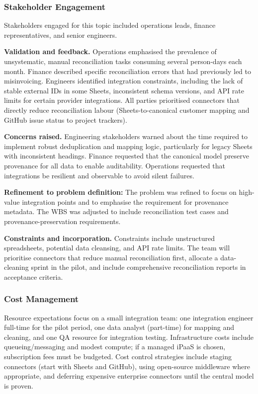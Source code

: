 \documentclass[12pt,a4paper]{report}
\begin{document}
\subsubsection{Stakeholder Engagement}
Stakeholders engaged for this topic included operations leads, finance representatives, and senior engineers.

\textbf{Validation and feedback.} Operations emphasised the prevalence of unsystematic, manual reconciliation tasks consuming several person-days each month. Finance described specific reconciliation errors that had previously led to misinvoicing. Engineers identified integration constraints, including the lack of stable external IDs in some Sheets, inconsistent schema versions, and API rate limits for certain provider integrations. All parties prioritised connectors that directly reduce reconciliation labour (Sheets-to-canonical customer mapping and GitHub issue status to project trackers).

\textbf{Concerns raised.} Engineering stakeholders warned about the time required to implement robust deduplication and mapping logic, particularly for legacy Sheets with inconsistent headings. Finance requested that the canonical model preserve provenance for all data to enable auditability. Operations requested that integrations be resilient and observable to avoid silent failures.

\begin{noteBox}
\textbf{Refinement to problem definition:} The problem was refined to focus on high-value integration points and to emphasise the requirement for provenance metadata. The WBS was adjusted to include reconciliation test cases and provenance-preservation requirements.
\end{noteBox}

\textbf{Constraints and incorporation.} Constraints include unstructured spreadsheets, potential data cleansing, and API rate limits. The team will prioritise connectors that reduce manual reconciliation first, allocate a data-cleaning sprint in the pilot, and include comprehensive reconciliation reports in acceptance criteria.

\subsubsection{Cost Management}
Resource expectations focus on a small integration team: one integration engineer full-time for the pilot period, one data analyst (part-time) for mapping and cleaning, and one QA resource for integration testing. Infrastructure costs include queueing/messaging and modest compute; if a managed iPaaS is chosen, subscription fees must be budgeted. Cost control strategies include staging connectors (start with Sheets and GitHub), using open-source middleware where appropriate, and deferring expensive enterprise connectors until the central model is proven.
\end{document}
